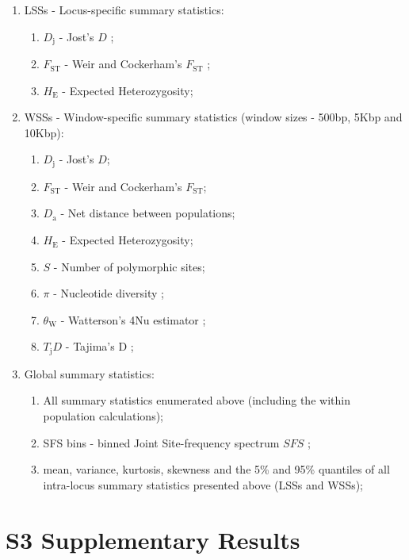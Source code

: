 \documentclass[a4paper, 12pt]{article}
\begin{document}
\begin{enumerate}
	\item LSSs - Locus-specific summary statistics:
    \begin{enumerate}
    	\item $D_{\mathrm{j}}$ - Jost's $D$ \citep{Jost:2008cs,Jost:2009hn};
        \item $F_{\mathrm{ST}}$ - Weir and Cockerham's $F_{\mathrm{ST}}$ \citep{Weir:1984dx};
        \item $H_{\mathrm{E}}$ - Expected Heterozygosity;
    \end{enumerate}
    \item WSSs - Window-specific summary statistics (window sizes - 500bp, 5Kbp and 10Kbp):
    \begin{enumerate}
        \item $D_{\mathrm{j}}$ - Jost's $D$;
        \item $F_{\mathrm{ST}}$ - Weir and Cockerham's $F_{\mathrm{ST}}$;
        \item $D_{\mathrm{a}}$ - Net distance between populations;
        \item $H_{\mathrm{E}}$ - Expected Heterozygosity;
        \item $S$ - Number of polymorphic sites;
        \item $\pi$ - Nucleotide diversity \citep{Nei:1979uk};
        \item $\theta_{\mathrm{W}}$ - Watterson's 4Nu estimator \citep{Watterson:1975bh};
        \item $T_{\mathrm{j}}D$ - Tajima's D \citep{Tajima:1989un};
    \end{enumerate}
    \item Global summary statistics:
    \begin{enumerate}
        \item All summary statistics enumerated above (including the within population calculations);
        \item SFS bins - binned Joint Site-frequency spectrum $SFS$ \citep{Ewing:2016gv};
        \item mean, variance, kurtosis, skewness and the 5\% and 95\% quantiles of all intra-locus summary statistics presented above (LSSs and WSSs);
    \end{enumerate}
\end{enumerate}

\section*{S3 Supplementary Results}
\end{document}
